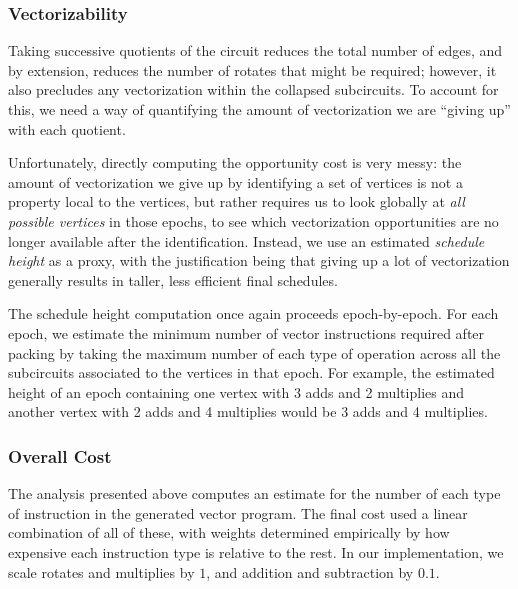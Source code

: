 \subsubsection*{Vectorizability}
Taking successive quotients of the circuit reduces the total number of edges, and by extension, reduces the number of rotates that might be required; however, it also precludes any vectorization within the collapsed subcircuits.
To account for this, we need a way of quantifying the amount of vectorization we are ``giving up'' with each quotient.

Unfortunately, directly computing the opportunity cost is very messy: the amount of vectorization we give up by identifying a set of vertices is not a property local to the vertices, but rather requires us to look globally at {\em all possible vertices} in those epochs, to see which vectorization opportunities are no longer available after the identification.
Instead, we use an estimated {\em schedule height} as a proxy, with the justification being that giving up a lot of vectorization generally results in taller, less efficient final schedules. 

The schedule height computation once again proceeds epoch-by-epoch.
For each epoch, we estimate the minimum number of vector instructions required after packing by taking the maximum number of each type of operation across all the subcircuits associated to the vertices in that epoch.
For example, the estimated height of an epoch containing one vertex with 3 adds and 2 multiplies and another vertex with 2 adds and 4 multiplies would be 3 adds and 4 multiplies.

\subsubsection*{Overall Cost}
The analysis presented above computes an estimate for the number of each type of instruction in the generated vector program.
The final cost used a linear combination of all of these, with weights determined empirically by how expensive each instruction type is relative to the rest.
In our implementation, we scale rotates and multiplies by $1$, and addition and subtraction by $0.1$. 

